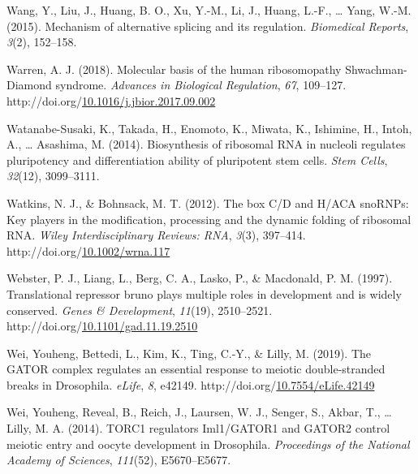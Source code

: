 \documentclass[12pt,oneside]{reedthesis}
\newlength{\cslhangindent}
\newenvironment{CSLReferences}[2] %
 {%
  \setlength{\parindent}{0pt}
  \ifodd #1 \everypar{\setlength{\hangindent}{\cslhangindent}}\ignorespaces\fi
  \ifnum #2 > 0
  \setlength{\parskip}{#2\baselineskip}
  \fi
 }%
 {}
\begin{document}
\begin{CSLReferences}{1}{0}
\leavevmode{}%
Wang, Y., Liu, J., Huang, B. O., Xu, Y.-M., Li, J., Huang, L.-F., \ldots{} Yang, W.-M. (2015). Mechanism of alternative splicing and its regulation. \emph{Biomedical Reports}, \emph{3}(2), 152--158.

\leavevmode{}%
Warren, A. J. (2018). Molecular basis of the human ribosomopathy {Shwachman-Diamond} syndrome. \emph{Advances in Biological Regulation}, \emph{67}, 109--127. http://doi.org/\href{https://doi.org/10.1016/j.jbior.2017.09.002}{10.1016/j.jbior.2017.09.002}

\leavevmode{}%
Watanabe-Susaki, K., Takada, H., Enomoto, K., Miwata, K., Ishimine, H., Intoh, A., \ldots{} Asashima, M. (2014). Biosynthesis of ribosomal {RNA} in nucleoli regulates pluripotency and differentiation ability of pluripotent stem cells. \emph{Stem Cells}, \emph{32}(12), 3099--3111.

\leavevmode{}%
Watkins, N. J., \& Bohnsack, M. T. (2012). The box {C}/{D} and {H}/{ACA snoRNPs}: {Key} players in the modification, processing and the dynamic folding of ribosomal {RNA}. \emph{Wiley Interdisciplinary Reviews: RNA}, \emph{3}(3), 397--414. http://doi.org/\href{https://doi.org/10.1002/wrna.117}{10.1002/wrna.117}

\leavevmode{}%
Webster, P. J., Liang, L., Berg, C. A., Lasko, P., \& Macdonald, P. M. (1997). Translational repressor bruno plays multiple roles in development and is widely conserved. \emph{Genes \& Development}, \emph{11}(19), 2510--2521. http://doi.org/\href{https://doi.org/10.1101/gad.11.19.2510}{10.1101/gad.11.19.2510}

\leavevmode{}%
Wei, Youheng, Bettedi, L., Kim, K., Ting, C.-Y., \& Lilly, M. (2019). The {GATOR} complex regulates an essential response to meiotic double-stranded breaks in {Drosophila}. \emph{eLife}, \emph{8}, e42149. http://doi.org/\href{https://doi.org/10.7554/eLife.42149}{10.7554/eLife.42149}

\leavevmode{}%
Wei, Youheng, Reveal, B., Reich, J., Laursen, W. J., Senger, S., Akbar, T., \ldots{} Lilly, M. A. (2014). {TORC1} regulators {Iml1}/{GATOR1} and {GATOR2} control meiotic entry and oocyte development in {Drosophila}. \emph{Proceedings of the National Academy of Sciences}, \emph{111}(52), E5670--E5677.


\end{CSLReferences}
\end{document}
